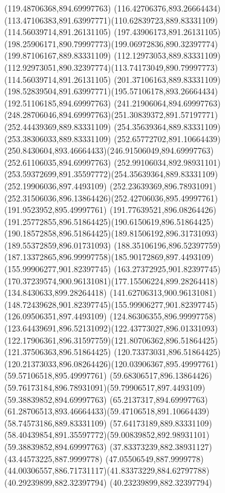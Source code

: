 {{	\lineto(119.48706368,894.69997763)
	\curveto(116.42706376,893.26664434)(113.47106383,891.63997771)(110.62839723,889.83331109)
	\moveto(114.56039714,891.26131105)
	\lineto(197.43906173,891.26131105)
	\curveto(198.25906171,890.79997773)(199.06972836,890.32397774)(199.87106167,889.83331109)
	\lineto(112.12973053,889.83331109)
	\curveto(112.92973051,890.32397774)(113.74173049,890.79997773)(114.56039714,891.26131105)
	\moveto(201.37106163,889.83331109)
	\curveto(198.52839504,891.63997771)(195.57106178,893.26664434)(192.51106185,894.69997763)
	\lineto(241.21906064,894.69997763)
	\curveto(248.28706046,894.69997763)(251.30839372,891.57197771)(252.44439369,889.83331109)
	\closepath
	\moveto(254.35639364,889.83331109)
	\lineto(253.38306033,889.83331109)
	\curveto(252.65772702,891.10664439)(250.8430604,893.46664433)(246.91506049,894.69997763)
	\lineto(252.61106035,894.69997763)
	\curveto(252.99106034,892.98931101)(253.59372699,891.35597772)(254.35639364,889.83331109)
	\moveto(252.19906036,897.4493109)
	\curveto(252.23639369,896.78931091)(252.31506036,896.13864426)(252.42706036,895.49997761)
	\lineto(191.9523952,895.49997761)
	\curveto(191.77639521,896.08264426)(191.25772855,896.51864425)(190.6150619,896.51864425)
	\curveto(190.18572858,896.51864425)(189.81506192,896.31731093)(189.55372859,896.01731093)
	\curveto(188.35106196,896.52397759)(187.13372865,896.99997758)(185.90172869,897.4493109)
	\closepath
	\moveto(155.99906277,901.82397745)
	\curveto(163.27372925,901.82397745)(170.37239574,900.96131081)(177.15506224,899.28264418)
	\lineto(134.8430633,899.28264418)
	\curveto(141.62706313,900.96131081)(148.72439628,901.82397745)(155.99906277,901.82397745)
	\moveto(126.09506351,897.4493109)
	\curveto(124.86306355,896.99997758)(123.64439691,896.52131092)(122.43773027,896.01331093)
	\curveto(122.17906361,896.31597759)(121.80706362,896.51864425)(121.37506363,896.51864425)
	\curveto(120.73373031,896.51864425)(120.21373033,896.08264426)(120.03906367,895.49997761)
	\lineto(59.57106518,895.49997761)
	\curveto(59.68306517,896.13864426)(59.76173184,896.78931091)(59.79906517,897.4493109)
	\closepath
	\moveto(59.38839852,894.69997763)
	\lineto(65.2137317,894.69997763)
	\curveto(61.28706513,893.46664433)(59.47106518,891.10664439)(58.74573186,889.83331109)
	\lineto(57.64173189,889.83331109)
	\curveto(58.40439854,891.35597772)(59.00839852,892.98931101)(59.38839852,894.69997763)
	\moveto(37.83373239,882.38931127)
	\lineto(43.44573225,887.9999778)
	\lineto(47.05506549,887.9999778)
	\curveto(44.00306557,886.71731117)(41.83373229,884.62797788)(40.29239899,882.32397794)
	\lineto(40.23239899,882.32397794)
}}
